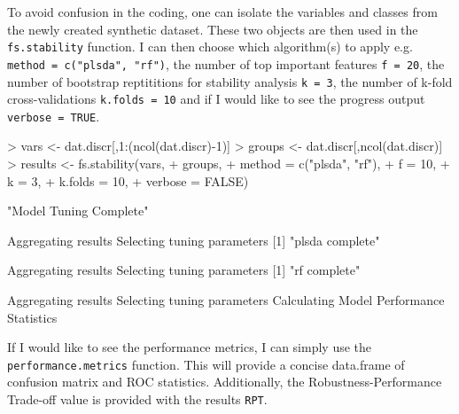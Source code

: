 \documentclass[12pt]{article}
\renewenvironment{Schunk}{\vspace{\topsep}}{\vspace{\topsep}}
\begin{document}
\begin{Schunk}
\end{Schunk}

To avoid confusion in the coding, one can isolate the variables and classes from the newly created synthetic dataset.  These two objects are then used in the {\tt fs.stability} function.  I can then choose which algorithm(s) to apply e.g. {\tt method = c("plsda", "rf")}, the number of top important features {\tt f = 20}, the number of bootstrap reptititions for stability analysis {\tt k = 3}, the number of k-fold cross-validations {\tt k.folds = 10} and if I would like to see the progress output {\tt verbose = TRUE}.

\begin{Schunk}
\begin{Sinput}
> vars <- dat.discr[,1:(ncol(dat.discr)-1)]
> groups <- dat.discr[,ncol(dat.discr)]
> results <- fs.stability(vars, 
+                         groups, 
+                         method = c("plsda", "rf"), 
+                         f = 10, 
+                         k = 3, 
+                         k.folds = 10, 
+                         verbose = FALSE)
\end{Sinput}
\begin{Soutput}
[1] "Model Tuning Complete"

Aggregating results
Selecting tuning parameters
[1] "plsda complete"

Aggregating results
Selecting tuning parameters
[1] "rf complete"

Aggregating results
Selecting tuning parameters
Calculating Model Performance Statistics
\end{Soutput}
\end{Schunk}

If I would like to see the performance metrics, I can simply use the {\tt performance.metrics} function.  This will provide a concise data.frame of confusion matrix and ROC statistics.  Additionally, the Robustness-Performance Trade-off value is provided with the results {\tt RPT}.
\end{document}
